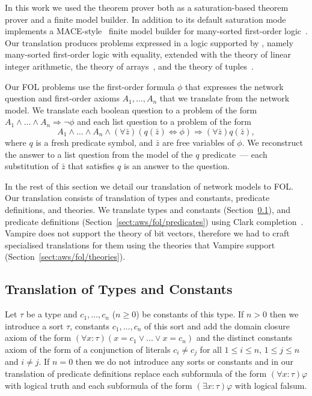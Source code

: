 In this work we used the \vampire theorem prover both as a saturation-based theorem prover and a finite model builder. In addition to its default saturation mode \vampire implements a MACE-style~\cite{mccune1994davis} finite model builder for many-sorted first-order logic~\cite{VampireFMB}. Our translation produces problems expressed in a logic supported by \vampire, namely many-sorted first-order logic with equality, extended with the theory of linear integer arithmetic, the theory of arrays~\cite{VampireAndFOOL}, and the theory of tuples~\cite{KKV18}. %

Our FOL problems use the first-order formula $\phi$ that expresses the network question and first-order axioms $A_1,\ldots,A_n$ that we translate from the network model. We translate each boolean question to a problem of the form $A_1\wedge\ldots\wedge A_n \Rightarrow \neg\phi$ and each list question to a problem of the form $$A_1\wedge\ldots\wedge A_n \wedge (\forall \bar{z})(q(\bar{z})\Leftrightarrow \phi) \Rightarrow (\forall \bar{z})q(\bar{z}),$$ where $q$ is a fresh predicate symbol, and $\bar{z}$ are free variables of $\phi$. We reconstruct the answer to a list question from the model of the $q$ predicate~--- each substitution of $\bar{z}$ that satisfies $q$ is an answer to the question.

In the rest of this section we detail our translation of network models to FOL. Our translation consists of translation of types and constants, predicate definitions, and theories. We translate types and constants (Section~\ref{sect:aws/fol/types}), and predicate definitions (Section~\ref{sect:aws/fol/predicates}) using Clark completion~\cite{DBLP:conf/adbt/Clark77}. Vampire does not support the theory of bit vectors, therefore we had to craft specialised translations for them using the theories that Vampire support (Section~\ref{sect:aws/fol/theories}).

\subsection{Translation of Types and Constants}\label{sect:aws/fol/types}

Let $\tau$ be a type and $c_1,\ldots,c_n$ ($n\ge0$) be constants of this type. If $n>0$ then we introduce a sort $\tau$, constants $c_1,\ldots,c_n$ of this sort and add the domain closure axiom of the form $(\forall x:\tau)(x=c_1 \vee\ldots\vee x=c_n)$ and the distinct constants axiom of the form of a conjunction of literals $c_i\not=c_j$ for all $1\le i\le n$, $1\le j\le n$ and $i\not=j$. If $n=0$ then we do not introduce any sorts or constants and in our translation of predicate definitions replace each subformula of the form $(\forall x:\tau)\varphi$ with logical truth and each subformula of the form $(\exists x:\tau)\varphi$ with logical falsum.

